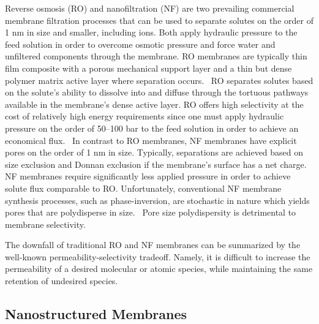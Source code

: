 \documentclass{article}
\begin{document}
  Reverse osmosis (RO) and nanofiltration (NF) are two prevailing commercial
  membrane filtration processes that can be used to separate solutes on the 
  order of 1 nm in size and smaller, including ions. Both apply hydraulic 
  pressure to the feed solution in order to overcome osmotic pressure and 
  force water and unfiltered components through the membrane. RO membranes
  are typically thin film composite with a porous mechanical support layer
  and a thin but dense polymer matrix active layer where separation occurs.~\cite{jeong_interfacial_2007}
  RO separates solutes based on the solute's ability to dissolve into and 
  diffuse through the tortuous pathways available in the membrane's dense 
  active layer. RO offers high selectivity at the cost of relatively high 
  energy requirements since one must apply hydraulic pressure on the order of
  50--100 bar to the feed solution in order to achieve an economical flux.~\cite{van_der_bruggen_review_2003}
  In contrast to RO membranes, NF membranes have explicit pores on the order
  of 1 nm in size. Typically, separations are achieved based on size exclusion
  and Donnan exclusion if the membrane's surface has a net charge.~\cite{donnan_theory_1995}
  NF membranes require significantly less applied pressure in order to achieve
  solute flux comparable to RO. Unfortunately, conventional NF membrane synthesis
  processes, such as phase-inversion\cite{smolders_microstructures_1992}, are 
  stochastic in nature which yields pores that are polydisperse in size.~\cite{werber_materials_2016}
  Pore size polydispersity is detrimental to membrane selectivity.
  
  The downfall of traditional RO and NF membranes can be summarized by the well-known
  permeability-selectivity tradeoff. Namely, it is difficult to increase the
  permeability of a desired molecular or atomic species, while maintaining
  the same retention of undesired species.\cite{werber_materials_2016}  
  
  \subsection*{Nanostructured Membranes}
  
\end{document}
